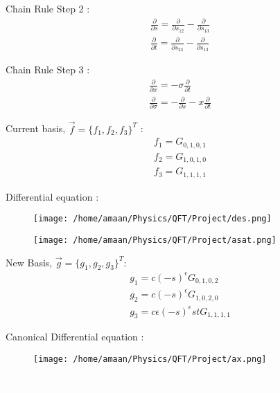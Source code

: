 \documentclass[11pt]{beamer}
\begin{document}
\begin{frame}
	Chain Rule Step 2 :
	\begin{align*}
		\frac{\partial}{\partial s}=\frac{\partial}{\partial s_{12}}-\frac{\partial}{\partial s_{13}}\\
		\frac{\partial}{\partial t}=\frac{\partial}{\partial s_{23}}-\frac{\partial}{\partial s_{13}}
	\end{align*}
\end{frame}
\begin{frame}
	Chain Rule Step 3 :
	\begin{align*}
		\frac{\partial}{\partial x}=-\sigma\frac{\partial}{\partial t}\\
		\frac{\partial}{\partial \sigma}=-\frac{\partial}{\partial s}-x\frac{\partial}{\partial t}
	\end{align*}
\end{frame}
\begin{frame}
	Current basis, $\vec{f}=\{f_1,f_2,f_3\}^T$ : 
	\begin{align*}
		f_1=G_{0,1,0,1}\\
		f_2=G_{1,0,1,0}\\
		f_3=G_{1,1,1,1}
	\end{align*}

\end{frame}
\begin{frame}
	Differential equation : 
\begin{figure}
	\centering
	\texttt{[image: /home/amaan/Physics/QFT/Project/des.png]}
	\label{fig:enter-label}
\end{figure}
\end{frame}
\begin{frame}
	\begin{figure}
		\centering
		\texttt{[image: /home/amaan/Physics/QFT/Project/asat.png]}
		\label{fig:enter-label}
	\end{figure}
\end{frame}
\begin{frame}
New Basis, $\vec{g}=\{g_1,g_2,g_3\}^T$: 
\begin{align*}
	g_1=c(-s)^\epsilon G_{0,1,0,2}\\
	g_2=c(-s)^\epsilon G_{1,0,2,0}\\
	g_3=c\epsilon(-s)^\epsilon stG_{1,1,1,1}
\end{align*}
\end{frame}
\begin{frame}
	Canonical Differential equation : 
		\begin{figure}
		\centering
		\texttt{[image: /home/amaan/Physics/QFT/Project/ax.png]}
		\label{fig:enter-label}
	\end{figure}
\end{frame}
{

\begin{frame}
	\begin{center}
		\textcolor{white}{HQET Integral Family at 2 loops}
	\end{center}
\end{frame}
}
\end{document}
